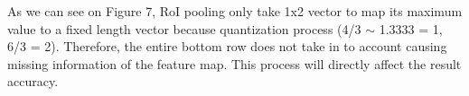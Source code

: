 	As we can see on Figure 7, RoI pooling only take 1x2 vector to map its maximum value to a fixed length vector because quantization process (4/3 $\sim$ 1.3333 = 1, 6/3 = 2). Therefore, the entire bottom row does not take in to account causing missing information of the feature map. This process will directly affect the result accuracy.
	
	
	
	
	
	
	
	
	
	
	
	
	